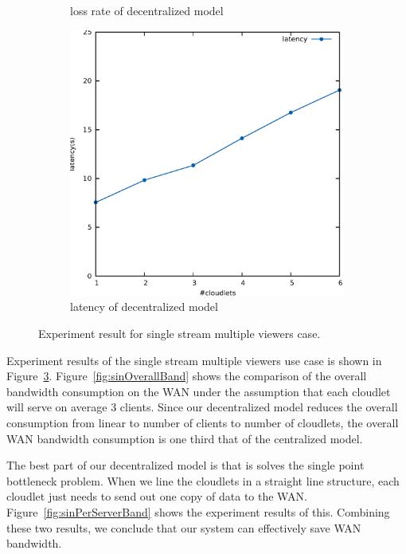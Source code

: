 \documentclass[letterpaper,twocolumn,10pt]{article}
\begin{document}
\begin{figure}[t]
\begin{subfigure}[t]{0.3\textwidth}
                \caption{loss rate of decentralized model}
                \label{fig:sinLossRate}
        \end{subfigure}
        \begin{subfigure}[t]{0.3\textwidth}
                \includegraphics[width=\textwidth]{pic/latency.eps}
                \caption{latency of decentralized model}
                \label{fig:sinLatency}
        \end{subfigure}
        \caption{Experiment result for single stream multiple viewers case.}\label{fig:SingleStream}
\end{figure}

Experiment results of the single stream multiple viewers use case is shown in Figure~\ref{fig:SingleStream}. Figure~\ref{fig:sinOverallBand} shows the comparison of the overall bandwidth consumption on the WAN under the assumption that each cloudlet will serve on average 3 clients. Since our decentralized model reduces the overall consumption from linear to number of clients to number of cloudlets, the overall WAN bandwidth consumption is one third that of the centralized model. 

The best part of our decentralized model is that is solves the single point bottleneck problem. When we line the cloudlets in a straight line structure, each cloudlet just needs to send out one copy of data to the WAN. Figure~\ref{fig:sinPerServerBand} shows the experiment results of this. Combining these two results, we conclude that our system can effectively save WAN bandwidth.
\end{document}
